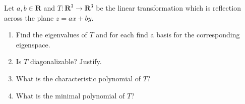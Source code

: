 \documentclass[11pt,twoside,openany]{memoir}
\begin{document}
        \begin{exercise}
        Let $a,b\in \mathbf{R}$ and $T:\mathbf{R}^3\to \mathbf{R}^3$ be the linear transformation which is reflection across the plane $z=ax+by$.
        \begin{enumerate}[label=(\alph*)]
            \item Find the eigenvalues of $T$ and for each find a basis for the corresponding eigenspace.
            \item Is $T$ diagonalizable? Justify.
            \item What is the characteristic polynomial of $T$?
            \item What is the minimal polynomial of $T$?
        \end{enumerate}
        \end{exercise}
        
    
        
            
            
        

    
        
    
\end{document}

